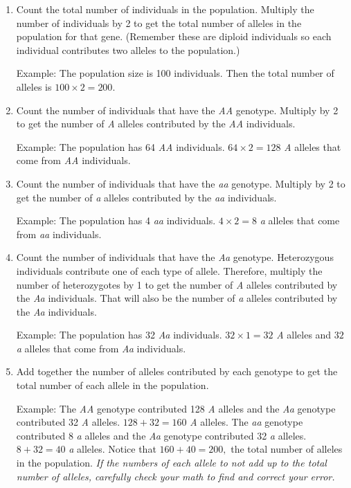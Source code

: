 \documentclass[12pt]{exam}
\newcommand{\allele}[1]{\textit{#1}}
\begin{document}
\begin{enumerate}
	\item Count the total number of individuals in the population. Multiply the number of individuals by 2 to get the total number of alleles in the population for that gene. (Remember these are diploid individuals so each individual contributes two alleles to the population.) 
	
	Example: The population size is 100 individuals. Then the total number of alleles is $100 \times 2 = 200.$
	
	\item Count the number of individuals that have the \allele{AA} genotype. Multiply by 2 to get the number of \allele{A} alleles contributed by the \allele{AA} individuals.
	
	Example: The population has 64 \allele{AA} individuals. $64 \times 2 = 128$ \allele{A} alleles that come from \allele{AA} individuals.
	
	\item Count the number of individuals that have the \allele{aa} genotype. Multiply by 2 to get the number of \allele{a} alleles contributed by the \allele{aa} individuals.
	
	Example: The population has 4 \allele{aa} individuals. $4 \times 2 = 8$ \allele{a} alleles that come from \allele{aa} individuals.
	
	\item Count the number of individuals that have the \allele{Aa} genotype. Heterozygous individuals contribute one of each type of allele. Therefore, multiply the number of heterozygotes by 1 to get the number of \allele{A} alleles contributed by the \allele{Aa} individuals. That will also be the number of \allele{a} alleles contributed by the \allele{Aa} individuals.
	
	Example: The population has 32 \allele{Aa} individuals. $32 \times 1 = 32$ \allele{A} alleles and $32$ \allele{a} alleles that come from \allele{Aa} individuals.
	
	\item Add together the number of alleles contributed by each genotype to get the total number of each allele in the population. 
	
	Example: The \allele{AA} genotype contributed 128 \allele{A} alleles and the \textit{Aa} genotype contributed 32 \textit{A} alleles. $128 + 32 = 160$ \allele{A} alleles.  The \allele{aa} genotype contributed 8 \allele{a} alleles and the \allele{Aa} genotype contributed 32 \allele{a} alleles. $8 + 32 = 40$ \allele{a} alleles. Notice that $160 + 40 = 200,$ the total number of alleles in the population. \emph{If the numbers of each allele to not add up to the total number of alleles, carefully check your math to find and correct your error.}
	

\end{enumerate}
\end{document}
